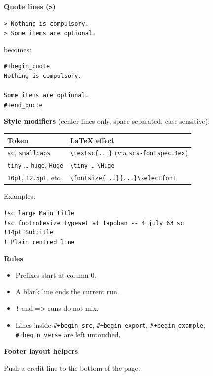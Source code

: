 \documentclass[11pt]{article}
\begin{document}
\textbf{\textbf{Quote lines (\texttt{>})}}

\begin{verbatim}
> Nothing is compulsory.
> Some items are optional.
\end{verbatim}

becomes:

\begin{verbatim}
#+begin_quote
Nothing is compulsory.

Some items are optional.
#+end_quote
\end{verbatim}

\textbf{\textbf{Style modifiers}} (center lines only, space-separated, case-sensitive):

\begin{center}
\begin{tabular}{ll}
Token & \LaTeX{} effect\\
\hline
\texttt{sc}, \texttt{smallcaps} & \texttt{\textbackslash{}textsc\{...\}} (via \texttt{scs-fontspec.tex})\\
\texttt{tiny} … \texttt{huge}, \texttt{Huge} & \texttt{\textbackslash{}tiny} … \texttt{\textbackslash{}Huge}\\
\texttt{10pt}, \texttt{12.5pt}, etc. & \texttt{\textbackslash{}fontsize\{...\}\{...\}\textbackslash{}selectfont}\\
\end{tabular}
\end{center}

Examples:

\begin{verbatim}
!sc large Main title
!sc footnotesize typeset at tapoban -- 4 july 63 sc
!14pt Subtitle
! Plain centred line
\end{verbatim}

\textbf{\textbf{Rules}}

\begin{itemize}
\item Prefixes start at column 0.
\item A blank line ends the current run.
\item \texttt{!} and => runs do not mix.
\item Lines inside \texttt{\#+begin\_src}, \texttt{\#+begin\_export}, \texttt{\#+begin\_example},
\texttt{\#+begin\_verse} are left untouched.
\end{itemize}

\textbf{\textbf{Footer layout helpers}}

Push a credit line to the bottom of the page:
\end{document}
